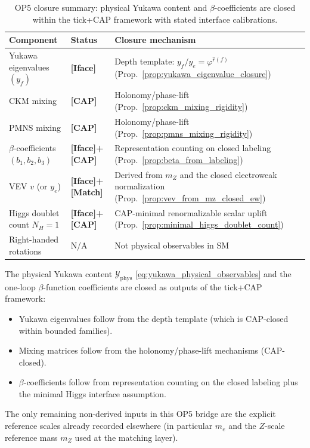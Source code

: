 \begin{table}[t]
\centering
\small
\setlength{\tabcolsep}{6pt}
\renewcommand{\arraystretch}{1.25}
\begin{tabular}{p{} p{} p{}}
\toprule
Component & Status & Closure mechanism \\
\midrule
Yukawa eigenvalues $(y_f)$ & \textbf{[Iface]} & Depth template: $y_f/y_e = \varphi^{\widehat r(f)}$ (Prop.~\ref{prop:yukawa_eigenvalue_closure}) \\
CKM mixing & \textbf{[CAP]} & Holonomy/phase-lift (Prop.~\ref{prop:ckm_mixing_rigidity}) \\
PMNS mixing & \textbf{[CAP]} & Holonomy/phase-lift (Prop.~\ref{prop:pmns_mixing_rigidity}) \\
$\beta$-coefficients $(b_1,b_2,b_3)$ & \textbf{[Iface]+[CAP]} & Representation counting on closed labeling (Prop.~\ref{prop:beta_from_labeling}) \\
\midrule
VEV $v$ (or $y_e$) & \textbf{[Iface]+[Match]} & Derived from $m_Z$ and the closed electroweak normalization (Prop.~\ref{prop:vev_from_mz_closed_ew}) \\
Higgs doublet count $N_H=1$ & \textbf{[Iface]+[CAP]} & CAP-minimal renormalizable scalar uplift (Prop.~\ref{prop:minimal_higgs_doublet_count}) \\
Right-handed rotations & N/A & Not physical observables in SM \\
\bottomrule
\end{tabular}
\caption{OP5 closure summary: physical Yukawa content and $\beta$-coefficients are closed within the tick+CAP framework with stated interface calibrations.}
\label{tab:op5_closure_summary}
\end{table}

The physical Yukawa content $\mathcal{Y}_{\mathrm{phys}}$ \eqref{eq:yukawa_physical_observables} and the one-loop $\beta$-function coefficients are closed as outputs of the tick+CAP framework:
\begin{itemize}
\item Yukawa eigenvalues follow from the depth template (which is CAP-closed within bounded families).
\item Mixing matrices follow from the holonomy/phase-lift mechanisms (CAP-closed).
\item $\beta$-coefficients follow from representation counting on the closed labeling plus the minimal Higgs interface assumption.
\end{itemize}
The only remaining non-derived inputs in this OP5 bridge are the explicit reference scales already recorded elsewhere (in particular $m_e$ and the $Z$-scale reference mass $m_Z$ used at the matching layer).

